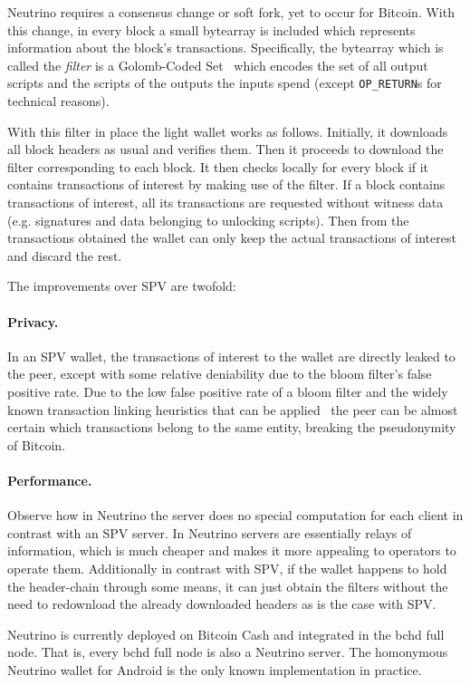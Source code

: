 \documentclass[sigconf]{acmart}
\begin{document}
Neutrino requires a consensus change or soft fork, yet to occur for Bitcoin. With this change, in every block a small bytearray is included which represents information about the block's transactions. Specifically, the bytearray which is called the \emph{filter} is a Golomb-Coded Set~\cite{golomb1966run}
which encodes the set of all output scripts and the scripts of the outputs the inputs spend (except \texttt{OP\_RETURN}s for technical reasons).

With this filter in place the light wallet works as follows. Initially, it downloads all block headers as usual and verifies them. Then it proceeds to download the filter corresponding to each block. It then checks locally for every block if it contains transactions of interest by making use of the filter. If a block contains transactions of interest, all its transactions are requested without witness data (e.g. signatures and data belonging to unlocking scripts). Then from the transactions obtained the wallet can only keep the actual transactions of interest and discard the rest.

The improvements over SPV are twofold:
\paragraph{Privacy.} In an SPV wallet, the transactions of interest to the wallet are directly leaked to the peer, except with some relative deniability due to the bloom filter's false positive rate. Due to the low false positive rate of a bloom filter and the widely known transaction linking heuristics that can be applied~\cite{meiklejohn2013fistful,gervais2014privacy}
the peer can be almost certain which transactions belong to the same entity, breaking the pseudonymity of Bitcoin.
\paragraph{Performance.} Observe how in Neutrino the server does no special computation for each client in contrast with an SPV server. In Neutrino servers are essentially relays of information, which is much cheaper and makes it more appealing to operators to operate them. Additionally in contrast with SPV, if the wallet happens to hold the header-chain through some means, it can just obtain the filters without the need to redownload the already downloaded headers as is the case with SPV.

Neutrino is currently deployed on Bitcoin Cash and integrated in the bchd full node.
That is, every bchd full node is also a Neutrino server.
The homonymous Neutrino wallet for Android is the only known implementation in practice.
\end{document}

